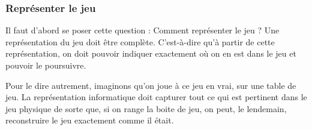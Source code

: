 		\subsubsection*{Représenter le jeu}

			Il faut d'abord se poser cette question :
			Comment représenter le jeu ?
			Une représentation du jeu doit être complète.
			C'est-à-dire qu'à partir de cette représentation,
			on doit pouvoir indiquer exactement où on en est dans le jeu
			et pouvoir le poursuivre.
			
			Pour le dire autrement, 
			imaginons qu'on joue à ce jeu \og{}en vrai\fg{}, sur une table de jeu.
			La représentation informatique doit capturer tout ce qui est pertinent
			dans le jeu physique de sorte que, si on range la boite de jeu,
			on peut, le lendemain, reconstruire le jeu exactement comme il était.
			
